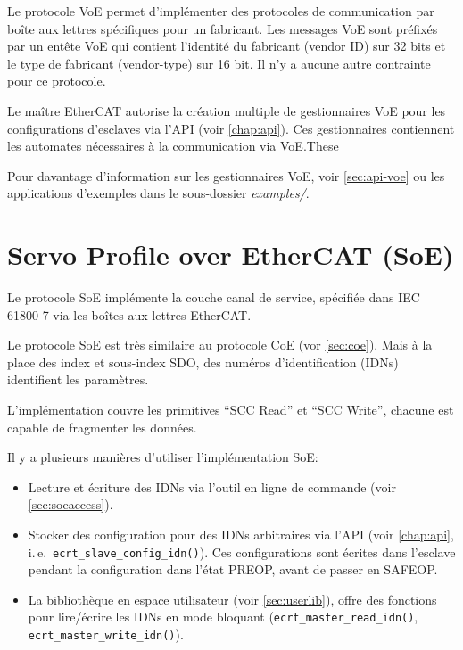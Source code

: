 \documentclass[a4paper,12pt,BCOR=6mm,bibtotoc,idxtotoc]{scrbook}
\begin{document}
Le protocole VoE permet d'impl\'ementer des protocoles de communication
par bo\^ite aux lettres sp\'ecifiques pour un fabricant.  Les messages
VoE sont pr\'efix\'es par un ent\^ete VoE qui contient l'identit\'e du
fabricant (vendor ID) sur 32 bits et le type de fabricant
(vendor-type) sur 16 bit.  Il n'y a aucune autre contrainte pour ce
protocole.

Le ma\^itre EtherCAT autorise la cr\'eation multiple de gestionnaires
VoE pour les configurations d'esclaves via l'API (voir
\autoref{chap:api}).  Ces gestionnaires contiennent les automates
n\'ecessaires \`a la communication via VoE.These

Pour davantage d'information sur les gestionnaires VoE, voir
\autoref{sec:api-voe} ou les applications d'exemples dans le
sous-dossier \textit{examples/}.


\section{Servo Profile over EtherCAT (SoE)}
\label{sec:soe}

Le protocole SoE impl\'emente la couche canal de service,
sp\'ecifi\'ee dans IEC 61800-7 \cite{soespec} via les bo\^ites aux
lettres EtherCAT.

Le protocole SoE est tr\`es similaire au protocole CoE (vor
\autoref{sec:coe}). Mais \`a la place des index et sous-index SDO, des
num\'eros d'identification (IDNs) identifient les param\`etres.

L'impl\'ementation couvre les primitives ``SCC Read'' et ``SCC Write'',
chacune est capable de fragmenter les donn\'ees.

Il y a plusieurs mani\`eres d'utiliser l'impl\'ementation SoE:

\begin{itemize}

\item Lecture et \'ecriture des IDNs via l'outil en ligne de commande (voir
\autoref{sec:soeaccess}).

\item Stocker des configuration pour des IDNs arbitraires via l'API
  (voir \autoref{chap:api}, i.\,e.~\lstinline+ecrt_slave_config_idn()+).
  Ces configurations sont \'ecrites dans l'esclave pendant la configuration
  dans l'\'etat PREOP, avant de passer en SAFEOP.

\item La biblioth\`eque en espace utilisateur (voir
  \autoref{sec:userlib}), offre des fonctions pour lire/\'ecrire les
  IDNs en mode bloquant (\lstinline+ecrt_master_read_idn()+,
  \lstinline+ecrt_master_write_idn()+).

\end{itemize}
\end{document}
